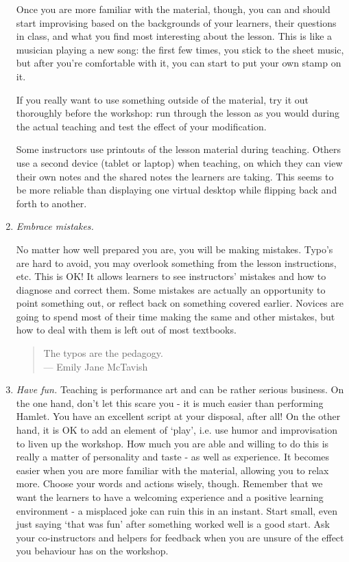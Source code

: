 \begin{enumerate}
  Once you are more familiar with the material, though, you can and
  should start improvising based on the backgrounds of your learners,
  their questions in class, and what you find most interesting about
  the lesson.  This is like a musician playing a new song: the first
  few times, you stick to the sheet music, but after you're
  comfortable with it, you can start to put your own stamp on it.

  If you really want to use something outside of the material, try it
  out thoroughly before the workshop: run through the lesson as you
  would during the actual teaching and test the effect of your
  modification.

  Some instructors use printouts of the lesson material during
  teaching.  Others use a second device (tablet or laptop) when
  teaching, on which they can view their own notes and the shared
  notes the learners are taking. This seems to be more reliable than
  displaying one virtual desktop while flipping back and forth to
  another.

\item
  \emph{Embrace mistakes.}

  No matter how well prepared you are, you will be making
  mistakes. Typo's are hard to avoid, you may overlook something from
  the lesson instructions, etc. This is OK! It allows learners to see
  instructors' mistakes and how to diagnose and correct them. Some
  mistakes are actually an opportunity to point something out, or
  reflect back on something covered earlier. Novices are going to
  spend most of their time making the same and other mistakes, but how
  to deal with them is left out of most textbooks.

  \begin{quote}
    The typos are the pedagogy.
    \\
    --- Emily Jane McTavish
  \end{quote}

\item
  \emph{Have fun.}  Teaching is performance art and can be rather
  serious business. On the one hand, don't let this scare you - it is
  much easier than performing Hamlet. You have an excellent script at
  your disposal, after all! On the other hand, it is OK to add an
  element of `play', i.e. use humor and improvisation to liven up the
  workshop. How much you are able and willing to do this is really a
  matter of personality and taste - as well as experience. It becomes
  easier when you are more familiar with the material, allowing you to
  relax more. Choose your words and actions wisely, though. Remember
  that we want the learners to have a welcoming experience and a
  positive learning environment - a misplaced joke can ruin this in an
  instant. Start small, even just saying `that was fun' after
  something worked well is a good start. Ask your co-instructors and
  helpers for feedback when you are unsure of the effect you behaviour
  has on the workshop.

\end{enumerate}

